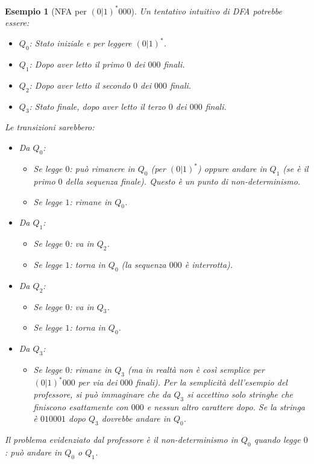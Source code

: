 \documentclass[a4paper]{article}
\newtheorem{example}{Esempio}[section]
\begin{document}
\begin{example}[NFA per $(0|1)^*000$]
Un tentativo intuitivo di DFA potrebbe essere:
\begin{itemize}
    \item $Q_0$: Stato iniziale e per leggere $(0|1)^*$.
    \item $Q_1$: Dopo aver letto il primo $0$ dei $000$ finali.
    \item $Q_2$: Dopo aver letto il secondo $0$ dei $000$ finali.
    \item $Q_3$: Stato finale, dopo aver letto il terzo $0$ dei $000$ finali.
\end{itemize}
Le transizioni sarebbero:
\begin{itemize}
    \item Da $Q_0$:
        \begin{itemize}
            \item Se legge $0$: può rimanere in $Q_0$ (per $(0|1)^*$) \emph{oppure} andare in $Q_1$ (se è il primo $0$ della sequenza finale). Questo è un punto di non-determinismo.
            \item Se legge $1$: rimane in $Q_0$.
        \end{itemize}
    \item Da $Q_1$:
        \begin{itemize}
            \item Se legge $0$: va in $Q_2$.
            \item Se legge $1$: torna in $Q_0$ (la sequenza $000$ è interrotta).
        \end{itemize}
    \item Da $Q_2$:
        \begin{itemize}
            \item Se legge $0$: va in $Q_3$.
            \item Se legge $1$: torna in $Q_0$.
        \end{itemize}
    \item Da $Q_3$:
        \begin{itemize}
            \item Se legge $0$: rimane in $Q_3$ (ma in realtà non è così semplice per $(0|1)^*000$ per via dei $000$ finali). Per la semplicità dell'esempio del professore, si può immaginare che da $Q_3$ si accettino solo stringhe che finiscono esattamente con $000$ e nessun altro carattere dopo. Se la stringa è $010001$ dopo $Q_3$ dovrebbe andare in $Q_0$.
        \end{itemize}
\end{itemize}
Il problema evidenziato dal professore è il \emph{non-determinismo} in $Q_0$ quando legge $0$: può andare in $Q_0$ o $Q_1$.
\end{example}
\end{document}
